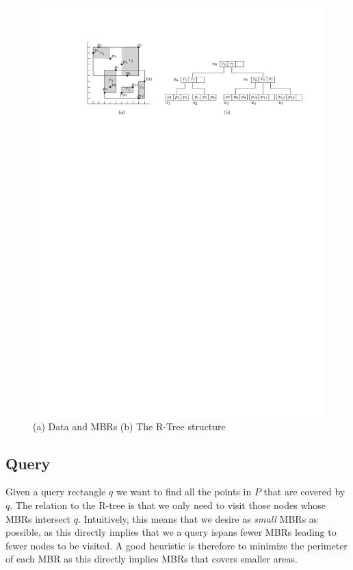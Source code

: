 \documentclass[twoside,11pt,openright]{report}
\begin{document}
\begin{figure}[h]
	\centering
     \includegraphics[width=\textwidth]{../figures/r_tree_data_and_mbrs}
     \caption{(a) Data and MBRs (b) The R-Tree structure}
     \label{fig:r_tree_structure}
\end{figure}

\subsection{Query}
Given a query rectangle $q$ we want to find all the points in $P$ that are covered by $q$. The relation to the R-tree is that we only need to visit those nodes whose MBRs intersect $q$. Intuitively, this means that we desire as \textit{small} MBRs as possible, as this directly implies that we a query ispans fewer MBRs leading to fewer nodes to be visited. A good heuristic is therefore to minimize the perimeter of each MBR as this directly implies MBRs that covers smaller areas.
\end{document}
